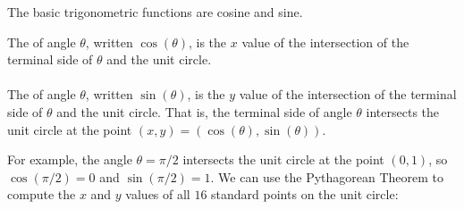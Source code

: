 \documentclass{ximera}
\begin{document}
The basic trigonometric functions are cosine and sine. 

\begin{definition}
The  of angle $\theta$, written $\cos(\theta)$, is the $x$ value of the intersection of the terminal side of $\theta$ and the unit circle. 
\\\\The {} of angle $\theta$, written $\sin(\theta)$, is the $y$ value of the intersection of the terminal side of $\theta$ and the unit circle. That is, the terminal side of angle $\theta$ intersects the unit circle at the point $(x,y)=(\cos(\theta),\sin(\theta))$.
\end{definition}

For example, the angle $\theta=\pi/2$ intersects the unit circle at the point $(0,1)$, so $\cos(\pi/2)=0$ and $\sin(\pi/2)=1$. We can use the Pythagorean Theorem to compute the $x$ and $y$ values of all $16$ standard points on the unit circle:
\end{document}

